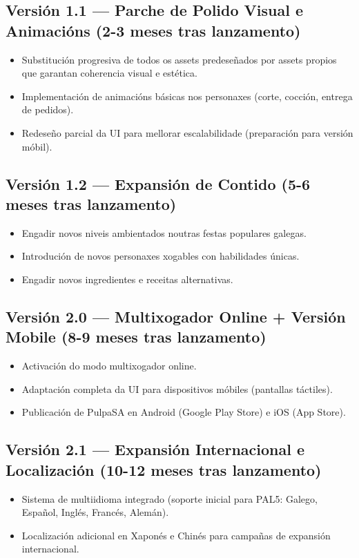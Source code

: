 \documentclass{report}  %
\begin{document}
\subsection*{Versión 1.1 — Parche de Polido Visual e Animacións (2-3 meses tras lanzamento)}
\begin{itemize}
    \item Substitución progresiva de todos os assets predeseñados por assets propios que garantan coherencia visual e estética.
    \item Implementación de animacións básicas nos personaxes (corte, cocción, entrega de pedidos).
    \item Redeseño parcial da UI para mellorar escalabilidade (preparación para versión móbil).
\end{itemize}

\subsection*{Versión 1.2 — Expansión de Contido (5-6 meses tras lanzamento)}
\begin{itemize}
    \item Engadir novos niveis ambientados noutras festas populares galegas.
    \item Introdución de novos personaxes xogables con habilidades únicas.
    \item Engadir novos ingredientes e receitas alternativas.
\end{itemize}

\subsection*{Versión 2.0 — Multixogador Online + Versión Mobile (8-9 meses tras lanzamento)}
\begin{itemize}
    \item Activación do modo multixogador online.
    \item Adaptación completa da UI para dispositivos móbiles (pantallas táctiles).
    \item Publicación de PulpaSA en Android (Google Play Store) e iOS (App Store).
\end{itemize}

\subsection*{Versión 2.1 — Expansión Internacional e Localización (10-12 meses tras lanzamento)}
\begin{itemize}
    \item Sistema de multiidioma integrado (soporte inicial para PAL5: Galego, Español, Inglés, Francés, Alemán).
    \item Localización adicional en Xaponés e Chinés para campañas de expansión internacional.
\end{itemize}
\end{document}
